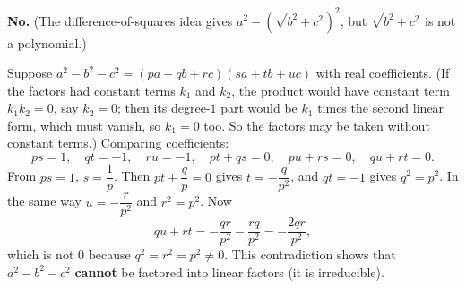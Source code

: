 \textbf{No.} (The difference-of-squares idea gives $a^2-\left(\sqrt{b^2+c^2}\right)^2$, but $\sqrt{b^2+c^2}$ is not a polynomial.)

Suppose $a^2-b^2-c^2=(pa+qb+rc)(sa+tb+uc)$ with real coefficients. (If the factors had constant terms $k_1$ and $k_2$, the product would have constant term $k_1k_2=0$, say $k_2=0$; then its degree-$1$ part would be $k_1$ times the second linear form, which must vanish, so $k_1=0$ too. So the factors may be taken without constant terms.) Comparing coefficients:
\[
ps=1,\quad qt=-1,\quad ru=-1,\quad pt+qs=0,\quad pu+rs=0,\quad qu+rt=0 .
\]
From $ps=1$, $s=\dfrac{1}{p}$. Then $pt+\dfrac {q}{p}=0$ gives $t=-\dfrac{q}{p^2}$, and $qt=-1$ gives $q^2=p^2$. In the same way $u=-\dfrac{r}{p^2}$ and $r^2=p^2$. Now
\[
qu+rt=-\dfrac{qr}{p^2}-\dfrac{rq}{p^2}=-\dfrac{2qr}{p^2},
\]
which is not $0$ because $q^2=r^2=p^2\ne0$. This contradiction shows that $a^2-b^2-c^2$ \textbf{cannot} be factored into linear factors (it is irreducible).

